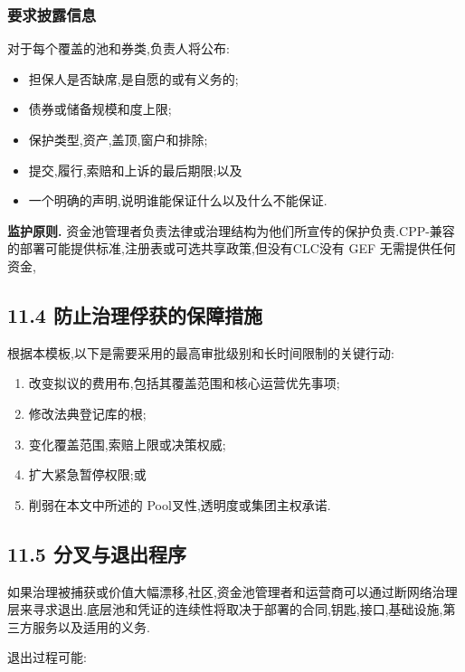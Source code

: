 \documentclass[11pt]{article}
\begin{document}
\subsubsection*{要求披露信息}

对于每个覆盖的池和券类,负责人将公布:

\begin{itemize}[leftmargin=*]
\item 担保人是否缺席,是自愿的或有义务的;
\item 债券或储备规模和度上限;
\item 保护类型,资产,盖顶,窗户和排除;
\item 提交,履行,索赔和上诉的最后期限;以及
\item 一个明确的声明,说明谁能保证什么以及什么不能保证.
\end{itemize}
\textbf{监护原则.} 资金池管理者负责法律或治理结构为他们所宣传的保护负责.CPP-兼容的部署可能提供标准,注册表或可选共享政策,但没有CLC没有 GEF 无需提供任何资金,

\subsection*{11.4 防止治理俘获的保障措施}

根据本模板,以下是需要采用的最高审批级别和长时间限制的关键行动:

\begin{enumerate}[leftmargin=*]
\item 改变拟议的费用布,包括其覆盖范围和核心运营优先事项;
\item 修改法典登记库的根;
\item 变化覆盖范围,索赔上限或决策权威;
\item 扩大紧急暂停权限;或
\item 削弱在本文中所述的 Pool叉性,透明度或集团主权承诺.
\end{enumerate}
\subsection*{11.5 分叉与退出程序}

如果治理被捕获或价值大幅漂移,社区,资金池管理者和运营商可以通过断网络治理层来寻求退出.底层池和凭证的连续性将取决于部署的合同,钥匙,接口,基础设施,第三方服务以及适用的义务.

退出过程可能:
\end{document}
